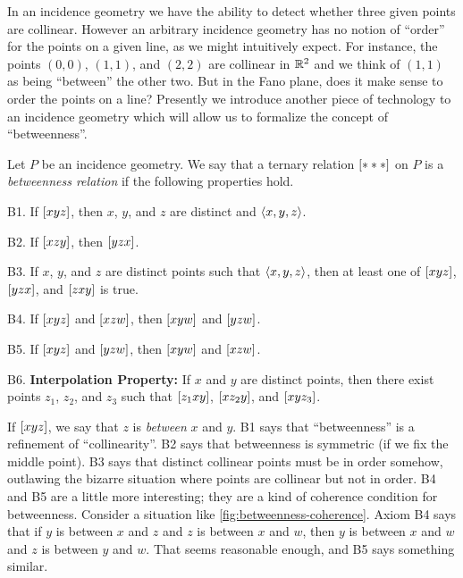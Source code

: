 In an incidence geometry we have the ability to detect whether three given points are collinear.
However an arbitrary incidence geometry has no notion of ``order'' for the points on a given line, as we might intuitively expect.
For instance, the points \((0,0)\), \((1,1)\), and \((2,2)\) are collinear in \(\mathbb{R}^2\) and we think of \((1,1)\) as being ``between'' the other two.
But in the Fano plane, does it make sense to order the points on a line?
Presently we introduce another piece of technology to an incidence geometry which will allow us to formalize the concept of ``betweenness''.

\begin{dfn}[Betweenness]
Let \(P\) be an incidence geometry.
We say that a ternary relation \([ \ast \ast \ast ]\) on \(P\) is a \emph{betweenness relation} if the following properties hold.
\begin{proplist}
\item[B1.] If \([ x y z ]\), then \(x\), \(y\), and \(z\) are distinct and \(\langle x, y, z \rangle\).
\item[B2.] If \([ x z y ]\), then \([ y z x ]\).
\item[B3.] If \(x\), \(y\), and \(z\) are distinct points such that \(\langle x, y, z \rangle\), then at least one of \([ x y z ]\), \([ y z x ]\), and \([ z x y ]\) is true.
\item[B4.] If \([ x y z ]\) and \([ x z w ]\), then \([ x y w ]\) and \([ y z w ]\).
\item[B5.] If \([ x y z ]\) and \([ y z w ]\), then \([ x y w ]\) and \([ x z w ]\).
\item[B6.] \textbf{Interpolation Property:} If \(x\) and \(y\) are distinct points, then there exist points \(z_1\), \(z_2\), and \(z_3\) such that \([ z_1 x y ]\), \([ x z_2 y ]\), and \([ x y z_3 ]\).
\end{proplist}
\end{dfn}

If \([ x y z ]\), we say that \(z\) is \emph{between} \(x\) and \(y\).
B1 says that ``betweenness'' is a refinement of ``collinearity''.
B2 says that betweenness is symmetric (if we fix the middle point).
B3 says that distinct collinear points must be in order somehow, outlawing the bizarre situation where points are collinear but not in order.
B4 and B5 are a little more interesting; they are a kind of coherence condition for betweenness.
Consider a situation like \autoref{fig:betweenness-coherence}.
Axiom B4 says that if \(y\) is between \(x\) and \(z\) and \(z\) is between \(x\) and \(w\), then \(y\) is between \(x\) and \(w\) and \(z\) is between \(y\) and \(w\).
That seems reasonable enough, and B5 says something similar.

